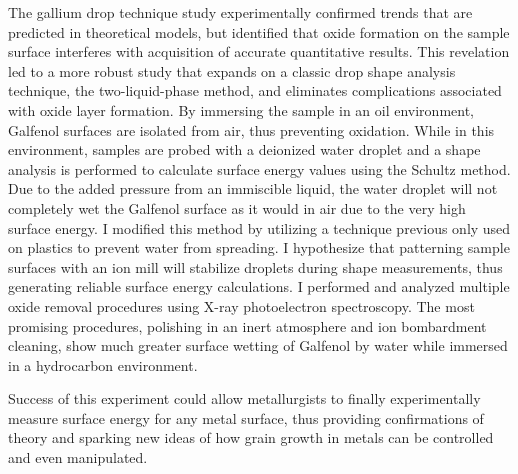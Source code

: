 The gallium drop technique study experimentally confirmed trends that are predicted in theoretical models, but identified that oxide formation on the sample surface interferes with acquisition of accurate quantitative results. This revelation led to a more robust study that expands on a classic drop shape analysis technique, the two-liquid-phase method, and eliminates complications associated with oxide layer formation. By immersing the sample in an oil environment, Galfenol surfaces are isolated from air, thus preventing oxidation. While in this environment, samples are probed with a deionized water droplet and a shape analysis is performed to calculate surface energy values using the Schultz method. Due to the added pressure from an immiscible liquid, the water droplet will not completely wet the Galfenol surface as it would in air due to the very high surface energy. I modified this method by utilizing a technique previous only used on plastics to prevent water from spreading. I hypothesize that patterning sample surfaces with an ion mill will stabilize droplets during shape measurements, thus generating reliable surface energy calculations. I performed and analyzed multiple oxide removal procedures using X-ray photoelectron spectroscopy. The most promising procedures, polishing in an inert atmosphere and ion bombardment cleaning, show much greater surface wetting of Galfenol by water while immersed in a hydrocarbon environment.

Success of this experiment could allow metallurgists to finally experimentally measure surface energy for any metal surface, thus providing confirmations of theory and sparking new ideas of how grain growth in metals can be controlled and even manipulated. 